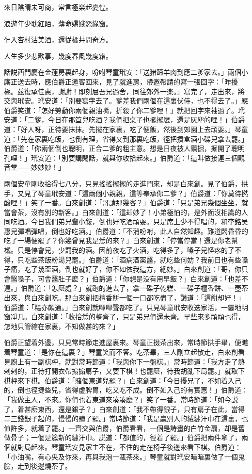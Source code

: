來日陰晴未可商，常言極楽起憂惶。

浪遊年少耽紅陌，薄命嬌娥怨綠窗。

乍入杏村沽美酒，還従橘井問奇方。

人生多少悲歡事，幾度春風幾度霜。

話説西門慶在金蓮房裏起身，吩咐琴童玳安：「送猪蹄羊肉到應二爹家去。」兩個小廝正送去時，應伯爵正邀客回來，見了就進房，帶邀帶請的寫一張回字：「昨擾極。兹復承佳惠，謝謝！即刻屈吾兄過舍，同往郊外一楽。」寫完了，走出來，將交與玳安。玳安道：「别要寫字去了。爹差我們兩個在這裏伏侍，也不得去了。」應伯爵笑道：「怎好勞動你兩個親油嘴，折殺了你二爹哩！」就把回字來袖過了。玳安道：「二爹，今日在那笪兒吃酒？我們把桌子也擺擺麽，還是灰塵的哩！」伯爵道：「好人呀，正待要抹抹。先擺在家裏，吃了便飯，然後到郊園上去頑耍。」琴童道：「先在家裏吃飯，也倒有理，省得又到那裏吃飯，徑把攢盒酒小碟兒拿去罷。」伯爵道：「你兩個倒也聰明，正合二爹的粗主意。想是日夜被人鑽掘，掘開了聰明孔哩！」玳安道：「別要講閑話，就與你收拾起來。」伯爵道：「這叫做接連三個觀音堂——妙妙妙！」

兩個安童剛收拾得七八分，只見搖搖擺擺的走進門來，却是白來創。見了伯爵，拱手，又見了琴童玳安道：「這兩個小親親，這等奉承你二爹？」伯爵道：「你莫待撚酸哩！」笑了一番。白來創道：「哥請那幾客？」伯爵道：「只是弟兄幾個坐坐，就當會茶，沒有別的新客。」白來創道：「這却妙了！小弟極怕的，是外面沒相識的人同吃酒。今日我們弟兄輩小敍，倒也好吃酒頑耍。只是席上少不得唱的，和李銘吴惠兒彈唱彈唱，倒也好吃酒。」伯爵道：「不消吩咐，此人自然知趣。難道悶昏昏的吃了一場便罷了？你幾曾見我是恁的來？」白來創道：「停當停當！還是你老幫襯。只是停會兒，少罰我的酒。因前夜吃了火酒，吃得多了，嗓子兒怪疼的了不得，只吃些茶飯粉湯兒罷。」伯爵道：「酒病酒薬醫，就吃些何妨？我前日也有些嗓子痛，吃了幾盃酒，倒也就好了，你不如依我這方，絶妙。」白來創道：「哥，你只會醫嗓子，可會醫肚子麽？」伯爵道：「你想是没有用早飯？」白來創道：「也差不遠。」伯爵道：「怎麽處？」就跑的進去了，拿一碟子乾糕、一碟子檀香餅、一壺茶出來，與白來創吃。那白來創把檀香餅一個一口都吃盡了，讚道：「這餅却好！」伯爵道：「糕亦頗通。」白來創就嗶嗶聲都吃了。只見琴童玳安收迭家活，一霎地明窗凈几。白來創道：「收拾恁的整齊了，只是弟兄們還未齊。早些來多頑頑也得，怎地只管縮在家裏，不知做甚的來？」

伯爵正望着外邊，只見常時節走進屋裏來。琴童正掇茶出來，常時節拱手畢，便瞧着琴童道：「是你在這裏？」琴童笑而不答。吃茶畢，三人剛立起散走，白來創看見廚上有一副棋枰，就對常時節道：「我與你下一盤棋。」常時節道：「我方走了熱剌剌的，正待打開衣帶搧搧扇子，又要下棋！也罷麽，待我胡亂下局罷。」就取下棋枰來下棋。伯爵道：「賭個東道兒罷？」白來創道：「今日擾兄了，不如着入己的，倒也徑捷些兒，省得虚脾胃，吃又吃不成。倒不如入己的有實惠！」伯爵道：「我做主人，不來。你們也着東道來凑凑麽？」笑了一番。常時節道：「如今説了，着甚麽東西，還是銀子？」白來創道：「我不帶得銀子，只有扇子在此，當得二三錢銀子起的，慢慢的贖了罷。」常時節道：「我是贏別人的絨繡汗巾在這裏，也值許多，就着了罷。」一齊交與伯爵，伯爵看看，一個是詩畫的白竹金扇，却是舊做骨子；一個是簇新的繡汗巾。説道：「都值的，徑着了罷。」伯爵把兩件拿了，兩個就對局起來。琴童玳安見家主不在，不住的走在椅子後邊來看下棋。伯爵道：「小油嘴，有心央及你來，再與我泡一甌茶來。」琴童就對玳安暗暗裏做了一個鬼臉，走到後邊燒茶了。

